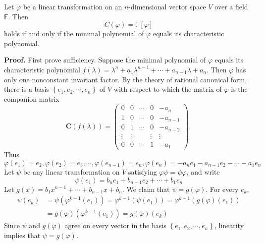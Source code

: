 \documentclass[12pt, a4paper, oneside]{book}
\begin{document}
\begin{theorem}
    Let $\varphi$ be a linear transformation on an $n$-dimensional vector space $V$ over a field $\mathbb{F}$. Then
    \[
        C(\varphi)
        =
        \mathbb{F}[\varphi]
    \]
    holds if and only if the minimal polynomial of $\varphi$ equals its characteristic polynomial.

    \textbf{Proof.}
    First prove sufficiency. Suppose the minimal polynomial of $\varphi$ equals its characteristic polynomial $f(\lambda)=\lambda^n+a_1 \lambda^{n-1}+\cdots+a_{n-1} \lambda+a_n$. Then $\varphi$ has only one nonconstant invariant factor. By the theory of rational canonical form, there is a basis $\left\{e_1, e_2, \cdots, e_n\right\}$ of $V$ with respect to which the matrix of $\varphi$ is the companion matrix
    \[
        \mathbf{C}(f(\lambda))=\left(\begin{array}{ccccc}
                0      & 0      & \cdots & 0      & -a_n     \\
                1      & 0      & \cdots & 0      & -a_{n-1} \\
                0      & 1      & \cdots & 0      & -a_{n-2} \\
                \vdots & \vdots &        & \vdots & \vdots   \\
                0      & 0      & \cdots & 1      & -a_1
            \end{array}\right),
    \]
    Thus
    \[
        \varphi\left(e_1\right)=e_2, \varphi\left(e_2\right)=e_3, \cdots, \varphi\left(e_{n-1}\right)=e_n, \varphi\left(e_n\right)=-a_n e_1-a_{n-1} e_2-\cdots-a_1 e_n
    \]
    Let $\psi$ be any linear transformation on $V$ satisfying $\varphi \psi=\psi \varphi$, and write
    \[
        {\psi}\left({e}_1\right)=b_n {e}_1+b_{n-1} {e}_2+\cdots+b_1 {e}_n
    \]
    Let $g(x)=b_1 x^{n-1}+\cdots+b_{n-1} x+b_n$. We claim that ${\psi}=g(\varphi)$. For every ${e}_k$,
    \[
        \begin{aligned}
            \psi\left(e_k\right) & =\psi\left({\varphi}^{k-1}\left(e_1\right)\right)={\varphi}^{k-1}\left(\psi\left(e_1\right)\right)={\varphi}^{k-1}\left(g(\varphi)\left(e_1\right)\right) \\
                                 & =g({\varphi})\left({\varphi}^{k-1}\left(e_1\right)\right)=g({\varphi})\left(e_k\right)
        \end{aligned}
    \]
    Since $\psi$ and $g(\varphi)$ agree on every vector in the basis $\left\{e_1, e_2, \cdots, e_n\right\}$, linearity implies that $\psi=g({\varphi})$.


\end{theorem}
\end{document}
